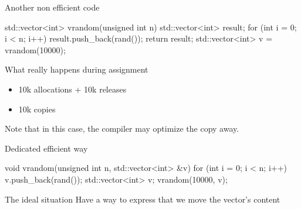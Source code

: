 \begin{frame}[fragile]
  \begin{exampleblock}{Another non efficient code}
    \begin{cppcode*}{}
      std::vector<int> vrandom(unsigned int n) {
        std::vector<int> result;
        for (int i = 0; i < n; i++) {
          result.push_back(rand());
        }
        return result;
      }
      std::vector<int> v = vrandom(10000);
    \end{cppcode*}
  \end{exampleblock}
  \pause
  \begin{alertblock}{What really happens during assignment}
    \begin{itemize}
    \item 10k allocations + 10k releases
    \item 10k copies
    \end{itemize}
    Note that in this case, the compiler may optimize the copy away.
  \end{alertblock}
\end{frame}

\begin{frame}[fragile]
  \begin{exampleblock}{Dedicated efficient way}
    \begin{cppcode*}{}
      void vrandom(unsigned int n, std::vector<int> &v) {
        for (int i = 0; i < n; i++) {
          v.push_back(rand());
        }
      }
      std::vector<int> v;
      vrandom(10000, v);
    \end{cppcode*}
  \end{exampleblock}
  \pause
  \begin{block}{The ideal situation}
    Have a way to express that we move the vector's content
  \end{block}
\end{frame}

